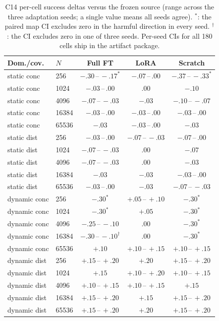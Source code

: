 \documentclass[letterpaper]{article} %
\newcommand{\stage}[1]{\textsc{#1}}
\begin{document}
\begin{table}[t]
\centering
\small
\setlength{\tabcolsep}{2.2pt}
\begin{tabular}{@{}llccc@{}}
\toprule
Dom./cov. & $N$ & Full FT & LoRA & Scratch \\
\midrule
static conc & 256 & $-.30\,$--$\,-.17^{*}$ & $-.07\,$--$\,.00$ & $-.37\,$--$\,-.33^{*}$ \\
static conc & 1024 & $-.03\,$--$\,.00$ & $.00$ & $-.10$ \\
static conc & 4096 & $-.07\,$--$\,-.03$ & $-.03$ & $-.10\,$--$\,-.07$ \\
static conc & 16384 & $-.03\,$--$\,.00$ & $-.03\,$--$\,.00$ & $-.03\,$--$\,.00$ \\
static conc & 65536 & $-.03$ & $-.03\,$--$\,.00$ & $-.03$ \\
static dist & 256 & $-.03\,$--$\,.00$ & $-.07\,$--$\,-.03$ & $-.07\,$--$\,.00$ \\
static dist & 1024 & $-.07\,$--$\,-.03$ & $.00$ & $-.07$ \\
static dist & 4096 & $-.07\,$--$\,-.03$ & $.00$ & $-.03$ \\
static dist & 16384 & $-.03$ & $-.03$ & $-.03\,$--$\,.00$ \\
static dist & 65536 & $-.03\,$--$\,.00$ & $-.03$ & $-.07\,$--$\,-.03$ \\
dynamic conc & 256 & $-.30^{*}$ & $+.05\,$--$\,+.10$ & $-.30^{*}$ \\
dynamic conc & 1024 & $-.30^{*}$ & $+.05$ & $-.30^{*}$ \\
dynamic conc & 4096 & $-.25\,$--$\,-.10$ & $.00$ & $-.30^{*}$ \\
dynamic conc & 16384 & $-.30\,$--$\,-.10^{\dagger}$ & $.00$ & $-.30^{*}$ \\
dynamic conc & 65536 & $+.10$ & $+.10\,$--$\,+.15$ & $+.10\,$--$\,+.15$ \\
dynamic dist & 256 & $+.15\,$--$\,+.20$ & $+.20$ & $+.15\,$--$\,+.20$ \\
dynamic dist & 1024 & $+.15$ & $+.10\,$--$\,+.20$ & $+.10\,$--$\,+.15$ \\
dynamic dist & 4096 & $+.10\,$--$\,+.15$ & $+.10\,$--$\,+.15$ & $+.15$ \\
dynamic dist & 16384 & $+.15\,$--$\,+.20$ & $+.15$ & $+.15\,$--$\,+.20$ \\
dynamic dist & 65536 & $+.15\,$--$\,+.20$ & $+.20$ & $+.15\,$--$\,+.20$ \\
\bottomrule
\end{tabular}
\caption{\stage{C14} per-cell success deltas versus the frozen source (range across the three adaptation seeds; a single value means all seeds agree). $^{*}$: the paired map CI excludes zero in the harmful direction in every seed. $^{\dagger}$: the CI excludes zero in one of three seeds. Per-seed CIs for all 180 cells ship in the artifact package.}
\label{tab:c14cells}
\end{table}
\end{document}
